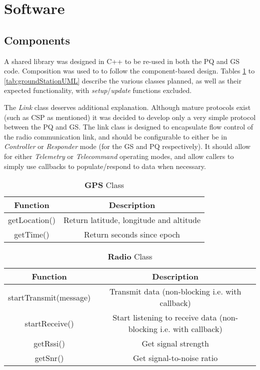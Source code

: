 \graphicspath{{./figures}}

\section{Software}

\subsection{Components}

A shared library was designed in C++ to be re-used in both the PQ and GS code. Composition was used to to follow the component-based design. Tables \ref{tab:gpsUML} to \ref{tab:groundStationUML} describe the various classes planned, as well as their expected functionality, with \textit{setup}/\textit{update} functions excluded.

The \textit{Link} class deserves additional explanation. Although mature protocols exist (such as CSP as mentioned) it was decided to develop only a very simple protocol between the PQ and GS. The link class is designed to encapsulate flow control of the radio communication link, and should be configurable to either be in \textit{Controller} or \textit{Responder} mode (for the GS and PQ respectively). It should allow for either \textit{Telemetry} or \textit{Telecommand} operating modes, and allow callers to simply use callbacks to populate/respond to data when necessary.

\begin{table}[!htb]
  \centering
  \caption{\textbf{GPS} Class}
  \renewcommand{\arraystretch}{1.2}
  \begin{tabular}{ |c|c| }
  \hline
  \textbf{Function}        & \textbf{Description}    \\
  \hline
    getLocation()              & Return latitude, longitude and altitude \\
    getTime()                  & Return seconds since epoch \\
  \hline
  \end{tabular}
  \label{tab:gpsUML}
\end{table}

\begin{table}[!htb]
  \centering
  \caption{\textbf{Radio} Class}
  \renewcommand{\arraystretch}{1.2}
  \begin{tabular}{ |c|c| }
  \hline
  \textbf{Function}        & \textbf{Description}    \\
  \hline
    startTransmit(message)              & Transmit data (non-blocking i.e. with callback) \\
    startReceive()                      & Start listening to receive data (non-blocking i.e. with callback) \\
    getRssi()                           & Get signal strength \\
    getSnr()                            & Get signal-to-noise ratio \\
  \hline
  \end{tabular}
  \label{tab:radioUML}
\end{table}

